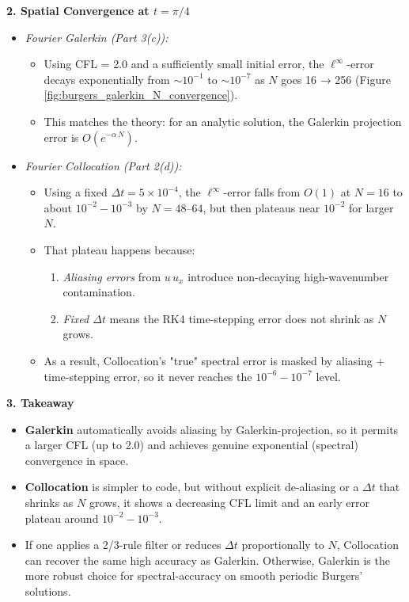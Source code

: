 \documentclass{article}
\begin{document}
\noindent\textbf{2. Spatial Convergence at \(t=\pi/4\)}  
\begin{itemize}
  \item \emph{Fourier Galerkin (Part 3(c)):}  
  \begin{itemize}
    \item Using CFL = 2.0 and a sufficiently small initial error, the $\ell^\infty$-error decays exponentially from \(\sim10^{-1}\) to \(\sim10^{-7}\) as \(N\) goes 16 → 256 (Figure \ref{fig:burgers_galerkin_N_convergence}).  
    \item This matches the theory: for an analytic solution, the Galerkin projection error is \(O(e^{-\alpha\,N})\).  
  \end{itemize}

  \item \emph{Fourier Collocation (Part 2(d)):}  
  \begin{itemize}
    \item Using a fixed \(\Delta t=5\!\times10^{-4}\), the $\ell^\infty$-error falls from \(O(1)\) at \(N=16\) to about \(10^{-2}\!-\!10^{-3}\) by \(N=48\)–\(64\), but then plateaus near \(10^{-2}\) for larger \(N\).  
    \item That plateau happens because:  
    \begin{enumerate}
      \item \emph{Aliasing errors} from \(u\,u_x\) introduce non-decaying high-wavenumber contamination.  
      \item \emph{Fixed \(\Delta t\)} means the RK4 time-stepping error does not shrink as \(N\) grows.  
    \end{enumerate}
    \item As a result, Collocation's "true" spectral error is masked by aliasing + time-stepping error, so it never reaches the \(10^{-6}\!-\!10^{-7}\) level.  
  \end{itemize}
\end{itemize}

\bigskip

\noindent\textbf{3. Takeaway}  
\begin{itemize}
  \item \textbf{Galerkin} automatically avoids aliasing by Galerkin-projection, so it permits a larger CFL (up to 2.0) and achieves genuine exponential (spectral) convergence in space.  
  \item \textbf{Collocation} is simpler to code, but without explicit de-aliasing or a \(\Delta t\) that shrinks as \(N\) grows, it shows a decreasing CFL limit and an early error plateau around \(10^{-2}\!-\!10^{-3}\).  
  \item If one applies a 2/3-rule filter or reduces \(\Delta t\) proportionally to \(N\), Collocation can recover the same high accuracy as Galerkin.  Otherwise, Galerkin is the more robust choice for spectral-accuracy on smooth periodic Burgers' solutions.
\end{itemize}
\end{document}
